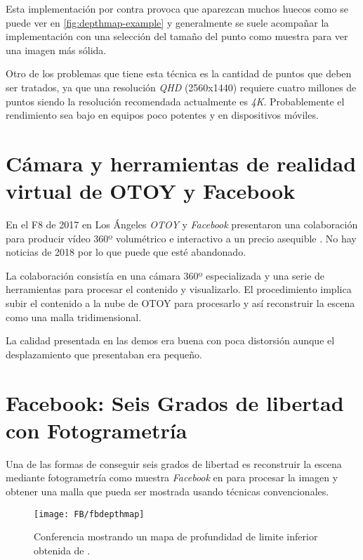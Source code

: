 Esta implementación por contra provoca que aparezcan muchos huecos como se puede ver en \ref{fig:depthmap-example} y generalmente se suele acompañar la implementación con una selección del tamaño del punto como muestra \cite{Josh6DoFUnity} para ver una imagen más sólida.

Otro de los problemas que tiene esta técnica es la cantidad de puntos que deben ser tratados, ya que una resolución \textit{QHD} (2560x1440) requiere cuatro millones de puntos siendo la resolución recomendada actualmente es \textit{4K}. Probablemente el rendimiento sea bajo en equipos poco potentes y en dispositivos móviles.

\section{Cámara y herramientas de realidad virtual de OTOY y Facebook}

En el F8 de 2017 en Los Ángeles \textit{OTOY} y \textit{Facebook} presentaron una colaboración para producir vídeo 360º volumétrico e interactivo a un precio asequible \cite{OtoyVR}. No hay noticias de 2018 por lo que puede que esté abandonado.

La colaboración consistía en una cámara 360º especializada y una serie de herramientas para procesar el contenido y visualizarlo. El procedimiento implica subir el contenido a la nube de OTOY para procesarlo y así reconstruir la escena como una malla tridimensional.

La calidad presentada en las demos era buena con poca distorsión aunque el desplazamiento que presentaban era pequeño.

\section{Facebook: Seis Grados de libertad con Fotogrametría}
Una de las formas de conseguir seis grados de libertad es reconstruir la escena mediante fotogrametría como muestra \textit{Facebook} en \cite{FBCasual3DCapture} para procesar la imagen y obtener una malla que pueda ser mostrada usando técnicas convencionales.

\begin{figure}[H]
  \centering
	\texttt{[image: FB/fbdepthmap]}
  \caption{Conferencia mostrando un mapa de profundidad de limite inferior obtenida de \cite{FBCasual3DCapture}.}
  \label{fig:fbLBdepthmap-example}
\end{figure}
\FloatBarrier

